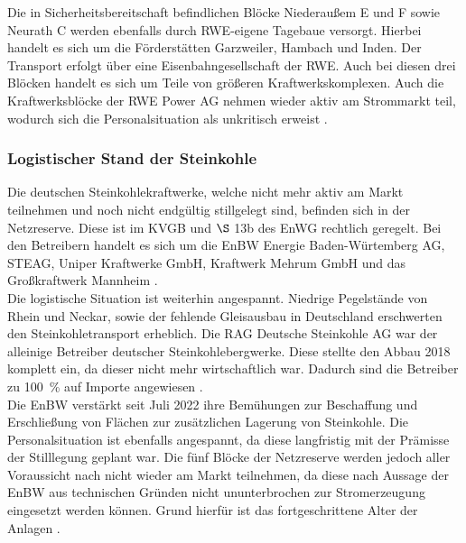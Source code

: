 			Die in Sicherheitsbereitschaft befindlichen Blöcke Niederaußem E und F sowie Neurath C werden ebenfalls durch RWE-eigene Tagebaue versorgt. 
			Hierbei handelt es sich um die Förderstätten Garzweiler, Hambach und Inden. 
			Der Transport erfolgt über eine Eisenbahngesellschaft der RWE. 
			Auch bei diesen drei Blöcken handelt es sich um Teile von größeren Kraftwerkskomplexen. 
			Auch die Kraftwerksblöcke der RWE Power AG nehmen wieder aktiv am Strommarkt teil, wodurch sich die Personalsituation als unkritisch erweist \cite{Mail_RWE}. 
	
		\subsubsection{Logistischer Stand der Steinkohle} \label{sect: Steinkohle}
		
			Die deutschen Steinkohlekraftwerke, welche nicht mehr aktiv am Markt teilnehmen und noch nicht endgültig stillgelegt sind, befinden sich in der Netzreserve. 
			Diese ist im KVGB und $\S$ 13b des EnWG rechtlich geregelt. 
			Bei den Betreibern handelt es sich um die EnBW Energie Baden-Würtemberg AG, STEAG, Uniper Kraftwerke GmbH, Kraftwerk Mehrum GmbH und das Großkraftwerk Mannheim \cite{Excel_Kraftwerksliste}. \\
			
			Die logistische Situation ist weiterhin angespannt. 
			Niedrige Pegelstände von Rhein und Neckar, sowie der fehlende Gleisausbau in Deutschland erschwerten den Steinkohletransport erheblich. 
			Die RAG Deutsche Steinkohle AG war der alleinige Betreiber deutscher Steinkohlebergwerke. 
			Diese stellte den Abbau 2018 komplett ein, da dieser nicht mehr wirtschaftlich war.
			Dadurch sind die Betreiber zu \SI{100}{\percent} auf Importe angewiesen \cite{Ende_Steinkohle}. \\
			
			Die EnBW verstärkt seit Juli 2022 ihre Bemühungen zur Beschaffung und Erschließung von Flächen zur zusätzlichen Lagerung von Steinkohle.
			Die Personalsituation ist ebenfalls angespannt, da diese langfristig mit der Prämisse der Stilllegung geplant war. 
			Die fünf Blöcke der Netzreserve werden jedoch aller Voraussicht nach nicht wieder am Markt teilnehmen, da diese nach Aussage der EnBW aus technischen Gründen nicht ununterbrochen zur Stromerzeugung eingesetzt werden können. 
			Grund hierfür ist das fortgeschrittene Alter der Anlagen \cite{EnBW_Steinkohle}. \\
			

